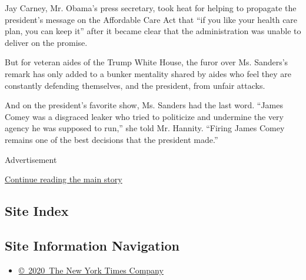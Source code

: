 Jay Carney, Mr. Obama's press secretary, took heat for helping to
propagate the president's message on the Affordable Care Act that ``if
you like your health care plan, you can keep it'' after it became clear
that the administration was unable to deliver on the promise.

But for veteran aides of the Trump White House, the furor over Ms.
Sanders's remark has only added to a bunker mentality shared by aides
who feel they are constantly defending themselves, and the president,
from unfair attacks.

And on the president's favorite show, Ms. Sanders had the last word.
``James Comey was a disgraced leaker who tried to politicize and
undermine the very agency he was supposed to run,'' she told Mr.
Hannity. ``Firing James Comey remains one of the best decisions that the
president made.''

Advertisement

\protect\hyperlink{after-bottom}{Continue reading the main story}

\hypertarget{site-index}{%
\subsection{Site Index}\label{site-index}}

\hypertarget{site-information-navigation}{%
\subsection{Site Information
Navigation}\label{site-information-navigation}}

\begin{itemize}
\tightlist
\item
  \href{https://help.nytimes3xbfgragh.onion/hc/en-us/articles/115014792127-Copyright-notice}{©~2020~The
  New York Times Company}
\end{itemize}

